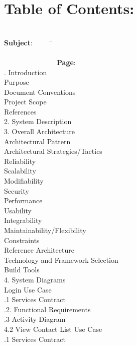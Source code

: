 \documentclass[29pt,a4paper]{moderncv}
\begin{document}
\section{\textbf{Table of Contents:}}
\begin{tabbing}
\\\textbf{Subject}: ~~~~~\= ~~~~~~~~~~~~~~~~~~~~~~~~~~~~~~~~~~~~~~~~~~~~~~~~~~~~~~~~~~~~~~~~~~~~~~~~~~~~~~~~~~~~~~~\= \textbf{Page}:
\\. Introduction \> \\							
 Purpose 	\\							
 Document Conventions 					\\
 Project Scope 							\\
 References 							\\
2. System Description \> 					\\
3. Overall Architecture \> 				\\
 Architectural Pattern  				\\
 Architectural Strategies/Tactics  	\\
\> Reliability 							\\
\> Scalability 							\\
\> Modifiability 							\\
\> Security						\\
\> Performance 						\\
\> Usability 							\\
\> Integrability 						\\
\> Maintainability/Flexibility 		\\
\> Constraints 						\\
 Reference Architecture 			\\
 Technology and Framework Selection  		\\
 Build Tools 							\\
4. System Diagrams \> \\
 Login Use Case \\
.1 Services Contract \\
.2. Functional Requirements \\
.3 Activity Diagram \\
4.2 View Contact List Use Case \> \\
.1 Services Contract \\

\end{tabbing}
\end{document}
